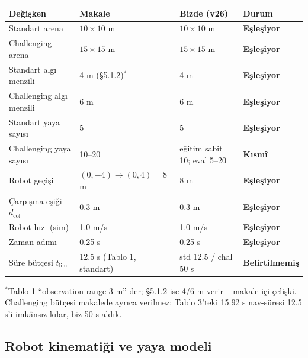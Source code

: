 \documentclass[11pt,a4paper]{article}
\newcommand{\dmatch}{\textcolor{cgreen}{\textbf{Eşleşiyor}}}
\newcommand{\dpart}{\textcolor{camber}{\textbf{Kısmî}}}
\newcommand{\dunspec}{\textcolor{camber}{\textbf{Belirtilmemiş}}}
\begin{document}
\begin{table}[H]
\centering\small
\begin{tabular}{@{}p{3.2cm}p{4.0cm}p{4.4cm}l@{}}
\toprule
\textbf{Değişken} & \textbf{Makale} & \textbf{Bizde (v26)} & \textbf{Durum} \\
\midrule
Standart arena & $10\times10$ m & $10\times10$ m & \dmatch \\
Challenging arena & $15\times15$ m & $15\times15$ m & \dmatch \\
Standart algı menzili & 4 m (\S5.1.2)$^{*}$ & 4 m & \dmatch \\
Challenging algı menzili & 6 m & 6 m & \dmatch \\
Standart yaya sayısı & 5 & 5 & \dmatch \\
Challenging yaya sayısı & 10--20 & eğitim sabit 10; eval 5--20 & \dpart \\
Robot geçişi & $(0,-4)\!\rightarrow\!(0,4)=8$ m & 8 m & \dmatch \\
Çarpışma eşiği $d_{\mathrm{col}}$ & 0.3 m & 0.3 m & \dmatch \\
Robot hızı (sim) & 1.0 m/s & 1.0 m/s & \dmatch \\
Zaman adımı & 0.25 s & 0.25 s & \dmatch \\
Süre bütçesi $t_{\lim}$ & 12.5 s (Tablo 1, standart) & std 12.5 / chal 50 s & \dunspec \\
\bottomrule
\end{tabular}
\par{\scriptsize $^{*}$Tablo 1 ``observation range 3 m'' der; \S5.1.2 ise 4/6 m verir -- makale-içi çelişki.
Challenging bütçesi makalede ayrıca verilmez; Tablo 3'teki 15.92 s nav-süresi 12.5 s'i imkânsız kılar,
biz 50 s aldık.}
\end{table}

\subsection{Robot kinematiği ve yaya modeli}
\end{document}
